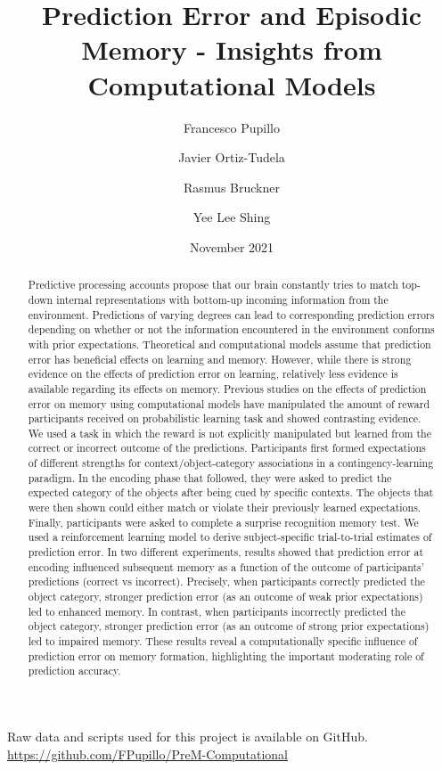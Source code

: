 \documentclass[a4paper,12pt]{article}
\title{Prediction Error and Episodic Memory - Insights from Computational Models}
\author[1]{Francesco Pupillo}
\author[1]{Javier Ortiz-Tudela}
\author[2]{Rasmus Bruckner}
\author[1]{Yee Lee Shing}
\affil[1]{Goethe-Universität Frankfurt}
\affil[2]{Freie Universität Berlin}
\date{November 2021}
\begin{document}
{
\hypersetup{linkcolor=black}
\tableofcontents
}
\setlength{\parindent}{10ex}

\maketitle

\noindent
Raw data and scripts used for this project is available on GitHub. \url{https://github.com/FPupillo/PreM-Computational} 

\doublespacing

\begin{abstract}
\noindent
Predictive processing accounts propose that our brain constantly tries to match top-down internal representations with bottom-up incoming information from the environment. Predictions of varying degrees can lead to corresponding prediction errors depending on whether or not the information encountered in the environment conforms with prior expectations. Theoretical and computational models assume that prediction error has beneficial effects on learning and memory. However, while there is strong evidence on the effects of prediction error on learning, relatively less evidence is available regarding its effects on memory. Previous studies on the effects of prediction error on memory using computational models have manipulated the amount of reward participants received on probabilistic learning task and showed contrasting evidence. We used a task in which the reward is not explicitly manipulated but learned from the correct or incorrect outcome of the predictions. Participants first formed expectations of different strengths for context/object-category associations in a contingency-learning paradigm. In the encoding phase that followed, they were asked to predict the expected category of the objects after being cued by specific contexts. The objects that were then shown could either match or violate their previously learned expectations. Finally, participants were asked to complete a surprise recognition memory test. We used a reinforcement learning model to derive subject-specific trial-to-trial estimates of prediction error. In two different experiments, results showed that prediction error at encoding influenced subsequent memory as a function of the outcome of participants’ predictions (correct vs incorrect). Precisely, when participants correctly predicted the object category, stronger prediction error (as an outcome of weak prior expectations) led to enhanced memory. In contrast, when participants incorrectly predicted the object category, stronger prediction error (as an outcome of strong prior expectations) led to impaired memory. These results reveal a computationally specific influence of prediction error on memory formation, highlighting the important moderating role of prediction accuracy.     
\end{abstract}
\end{document}
